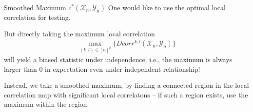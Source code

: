 \documentclass[mathserif,t]{beamer}
\newcommand{\G}{c}
\newcommand{\Mgc}{MGC}
\newcommand{\GG}{c}
\begin{document}



\begin{frame}{Smoothed Maximum $c^{*}(\mathcal{X}_{n},\mathcal{Y}_{n})$}
One would like to use the optimal local correlation for testing.\\
\pause
\medskip

But directly taking the maximum local correlation 
\begin{align*}
\max_{(k,l) \in [n]^2}\{Dcorr^{k,l}(\mathcal{X}_{n},\mathcal{Y}_{n})\}
\end{align*}
will yield a biased statistic under independence, i.e., the maximum is always larger than $0$ in expectation even under independent relationship!

\pause
\medskip
Instead, we take a smoothed maximum, by finding a connected region in the local correlation map with significant local correlatons -- if such a region exists, use the maximum within the region.
\end{frame}
\end{document}
